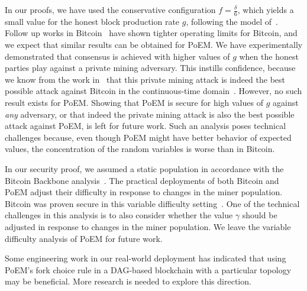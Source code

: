 \noindent
{}
In our proofs, we have used the conservative configuration $f = \frac{\delta}{6}$,
which yields a small value for the honest block production rate $g$, following the model
of~\cite{backbone}. Follow up works in Bitcoin~\cite{tight-bounds} have shown tighter
operating limits for Bitcoin, and we expect that similar results can be obtained for PoEM.
We have experimentally demonstrated that consensus is achieved with higher values
of $g$ when the honest parties play against a private mining adversary. This instills
confidence, because we know from the work in~\cite{eiar} that this private mining attack
is indeed the best possible attack against Bitcoin in the continuous-time domain~\cite{bitcoin-made-simple}.
However, no such result exists for
PoEM. Showing that PoEM is secure for high values of $g$ against \emph{any} adversary,
or that indeed the private mining attack is also the best possible attack against PoEM,
is left for future work. Such an analysis poses technical challenges because, even though
PoEM might have better behavior of expected values, the concentration of the random
variables is worse than in Bitcoin.

\noindent
{}
In our security proof, we assumed a static population in accordance with
the Bitcoin Backbone analysis~\cite{backbone}. The practical deployments of
both Bitcoin and PoEM adjust their difficulty in response to changes in the
miner population. Bitcoin was proven secure in this variable difficulty
setting~\cite{varbackbone}. One of the technical challenges in this analysis
is to also consider whether the value $\gamma$ should be adjusted in response
to changes in the miner population.
We leave the variable difficulty analysis of PoEM
for future work.

\noindent
\myparagraph[DAGs]
Some engineering work in our real-world deployment has indicated that using
PoEM's fork choice rule in a DAG-based blockchain with a particular topology
may be beneficial. More research is needed to explore this direction.
